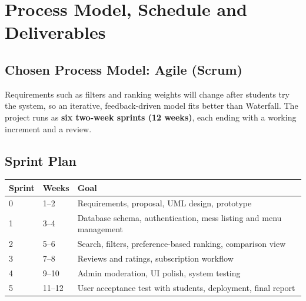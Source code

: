 \documentclass[11pt,a4paper]{article}
\begin{document}
\section{Process Model, Schedule and Deliverables}
\subsection{Chosen Process Model: Agile (Scrum)}
Requirements such as filters and ranking weights will change after students try the system, so an iterative, feedback-driven model fits better than Waterfall. The project runs as \textbf{six two-week sprints (12 weeks)}, each ending with a working increment and a review.

\subsection{Sprint Plan}
\begin{tabular}{@{}llp{9.3cm}@{}}\toprule
\textbf{Sprint} & \textbf{Weeks} & \textbf{Goal}\\\midrule
0 & 1--2 & Requirements, proposal, UML design, prototype\\
1 & 3--4 & Database schema, authentication, mess listing and menu management\\
2 & 5--6 & Search, filters, preference-based ranking, comparison view\\
3 & 7--8 & Reviews and ratings, subscription workflow\\
4 & 9--10 & Admin moderation, UI polish, system testing\\
5 & 11--12 & User acceptance test with students, deployment, final report\\\bottomrule
\end{tabular}
\end{document}
